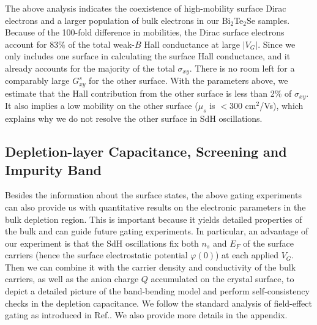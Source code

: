 The above analysis indicates the coexistence of high-mobility surface Dirac electrons and a larger population of bulk electrons in our Bi$_2$Te$_2$Se samples. Because of the 100-fold difference in mobilities,
the Dirac surface electrons account for 83$\%$ of the total weak-$B$ Hall conductance at large $|V_G|$. Since we only includes one surface in calculating the surface Hall conductance, and it already accounts for the majority of the total $\sigma_{xy}$. There is no room left for a comparably large $G^s_{xy}$ for the other surface. With the parameters above, we estimate that the Hall contribution from the other surface 
is less than 2$\%$ of $\sigma_{xy}$. It also implies a low mobility on the other surface ($\mu_s$ is $<$300 cm$^2$/Vs), which explains why we do not resolve the other surface in SdH oscillations.







\subsection{Depletion-layer Capacitance, Screening and Impurity Band}

Besides the information about the surface states, the above gating experiments can also provide us with quantitative results on the electronic parameters in the bulk depletion region. This is important because it yields detailed properties of the bulk and can guide future gating experiments. In particular, an advantage of our experiment is that the SdH oscillations fix both $n_s$ and $E_F$ of the surface carriers (hence the surface electrostatic potential $\varphi(0)$) at each applied $V_G$. Then we can combine it with the carrier density and conductivity of the bulk carriers, as well as the anion charge $Q$ accumulated on the crystal surface, to depict a detailed picture of the band-bending model and perform self-consistency checks in the depletion capacitance. We follow the standard analysis of field-effect gating as introduced in Ref.\cite{SternRMP,Ashcroft,Sze}. We also provide more details in the appendix. 


